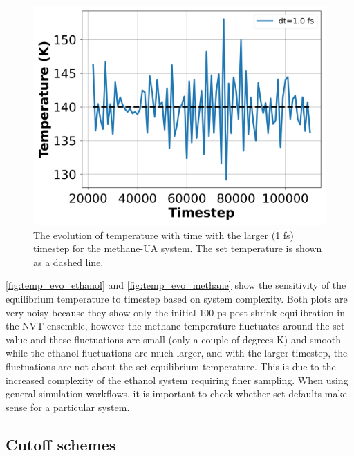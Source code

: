 \begin{figure}[h!]
    \centering
    \includegraphics[width=0.6\linewidth,keepaspectratio]{figures/rep_study/temp_evolution_methane.png}
    \caption{The evolution of temperature with time with the larger (1 fs) timestep for the methane-UA system. The set temperature is shown as a dashed line.}\label{fig:temp_evo_methane}
\end{figure}
\autoref{fig:temp_evo_ethanol} and \autoref{fig:temp_evo_methane} show the sensitivity of the equilibrium temperature to timestep based on system complexity. 
Both plots are very noisy because they show only the initial 100 ps post-shrink equilibration in the NVT ensemble, however the methane temperature fluctuates around the set value and these fluctuations are small (only a couple of degrees K) and smooth while the ethanol fluctuations are much larger, and with the larger timestep, the fluctuations are not about the set equilibrium temperature.
This is due to the increased complexity of the ethanol system requiring finer sampling.
When using general simulation workflows, it is important to check whether set defaults make sense for a particular system.

\subsection{Cutoff schemes}\label{sec:cutoff}

